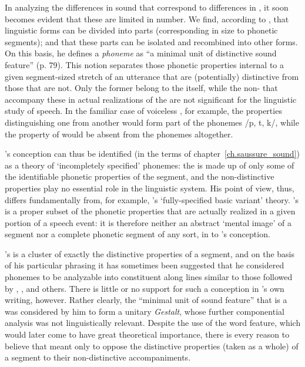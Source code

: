 In analyzing the differences in sound that correspond to differences
in , it soon becomes evident that these are limited in
number. We find, according to {\Bloomfield}, that linguistic forms can be
divided into parts (corresponding in size to phonetic segments); and
that these parts can be isolated and recombined into other forms. On
this basis, he defines a \emph{phoneme} as ``a minimal unit of
distinctive sound feature'' (p. 79). This notion separates those
phonetic properties internal to a given segment-sized stretch of an
utterance that are (potentially) distinctive from those that are
not. Only the former belong to the  itself, while the
non- that accompany these in actual realizations of
the  are not significant for the linguistic study of speech. In
the familiar case of  voiceless , for example, the
properties distinguishing one  from another would
form part of the phonemes /p, t, k/, while the property of 
would be absent from the phonemes altogether.

{\Bloomfield}'s conception can thus be identified (in the terms of
chapter~\ref{ch.saussure_sound}) as a theory of `incompletely
specified' phonemes: the  is made up of only some of the
identifiable phonetic properties of the segment, and the
non-distinct\-ive properties play no essential role in the linguistic
system. His point of view, thus, differs fundamentally from, for
example, {\Sapir}'s `fully-specified basic variant' theory. {\Bloomfield}'s
 is a proper subset of the phonetic properties that are
actually realized in a given portion of a speech event: it is
therefore neither an abstract `mental image' of a segment nor a
complete phonetic segment of any sort, in  to {\Sapir}'s
conception.

\largerpage
{\Bloomfield}'s  is a cluster of exactly the distinctive
properties of a segment, and on the basis of his particular phrasing
it has sometimes been suggested that he considered phonemes to be
analyzable into constituent  along lines similar
to those followed by {\Trubetzkoy}, {\Jakobson}, and others. There is little
or no support for such a conception in {\Bloomfield}'s own writing,
however. Rather clearly, the ``minimal unit of sound feature'' that is a
 was considered by him to form a unitary \emph{Gestalt}, whose
further componential analysis was not linguistically relevant. Despite
the use of the word feature, which would later come to have great
theoretical importance, there is every reason to believe that
{\Bloomfield} meant only to oppose the distinctive properties (taken as a
whole) of a segment to their non-distinctive accompaniments.

